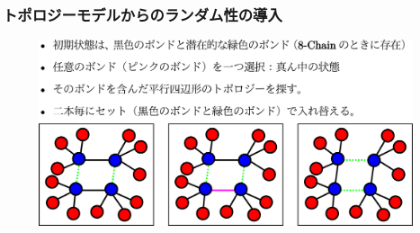 \documentclass[11pt, dvipdfmx]{beamer}
\begin{document}
\begin{frame}
\frametitle{トポロジーモデルからのランダム性の導入}

\vspace{-8mm}
\begin{figure}
\centering
\includegraphics[width=11cm]{./fig/ボンド交換.png}
\end{figure}
\end{frame}
\end{document}
